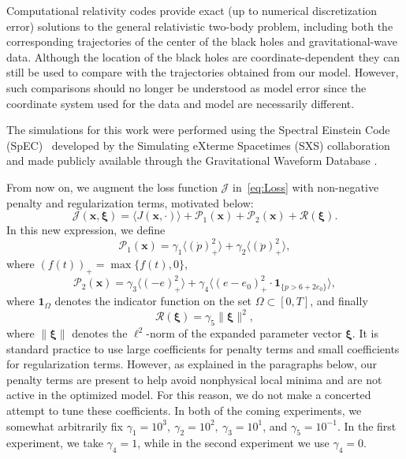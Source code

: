 \documentclass[ reprint,
nofootinbib,
 amsmath,amssymb,
 aps,
]{revtex4-2}
\begin{document}
Computational relativity codes provide 
exact (up to numerical discretization error) solutions to
the general relativistic two-body problem, including both the 
corresponding trajectories of the center of the black holes and 
gravitational-wave data. 
Although the location of the black holes
are 
coordinate-dependent they can still be used to compare with the trajectories obtained from our model.
However, such comparisons should no longer be understood as model error since the coordinate system
used for the data and model are necessarily different.

The simulations for this work 
were performed using the Spectral Einstein
Code (SpEC)~\cite{SpECwebsite,York:1998hy, Pfeiffer:2002iy, Lindblom:2005qh,Rinne:2008vn,Boyle:2019kee,SXSCatalog} 
developed by the Simulating eXterme Spacetimes (SXS)
collaboration~\cite{SpECwebsite} and made publicly available through the 
Gravitational Waveform Database \cite{Boyle:2019kee}.



From now on, we augment the loss function $\mathcal{J}$ in~\cref{eq:Loss} with non-negative penalty and regularization terms, motivated below:
\begin{equation}
\label{eq:NewJ}
	\mathcal{J}(\mathbf{x},\bm{\xi})
	=
	\langle J(\mathbf{x},\cdot) \rangle
	+
	\mathcal{P}_1(\mathbf{x})
	+
	\mathcal{P}_2(\mathbf{x})
	+
	\mathcal{R}(\bm{\xi})
	.
\end{equation}
In this new expression, we define
\begin{equation}
\label{eq:Penalty}
						\mathcal{P}_1(\mathbf{x})
	=
	\gamma_1\langle (\dot{p})_+^2 \rangle
	+
	\gamma_2\langle (\ddot{p})_+^2 \rangle
			,
\end{equation}
where $(f(t))_+ = \max\{f(t),0\}$,
\begin{equation}
\label{eq:Penalty2}
	\mathcal{P}_2(\mathbf{x})
	=
	\gamma_3\langle (-e)_+^2 \rangle
	+
	\gamma_4\langle (e-e_0)_+^2 \cdot \bm{1}_{\{p>6+2e_0\}} \rangle
	,
\end{equation}
where $\bm{1}_{\Omega}$ denotes the indicator function on the set $\Omega \subset [0,T]$, and finally
\begin{equation}
\label{eq:Regularization}
	\mathcal{R}(\bm{\xi})
	=
	\gamma_5\|\bm{\xi}\|^2
	,
\end{equation}
where $\|\bm{\xi}\|$ denotes the $\ell^2$-norm of the expanded parameter vector $\bm{\xi}$.
It is standard practice to use large coefficients for penalty terms and small coefficients for regularization terms.
However, as explained in the paragraphs below, our penalty terms are present to help avoid nonphysical local minima and are not active in the optimized model. For this reason, we do not make a concerted attempt to tune these coefficients.
In both of the coming experiments, we somewhat arbitrarily fix $\gamma_1 = 10^3,~ \gamma_2 = 10^2,~ \gamma_3 = 10^1$, and $\gamma_5 = 10^{-1}$.
In the first experiment, we take $\gamma_4 = 1$, while in the second experiment we use $\gamma_4 = 0$.
\end{document}
